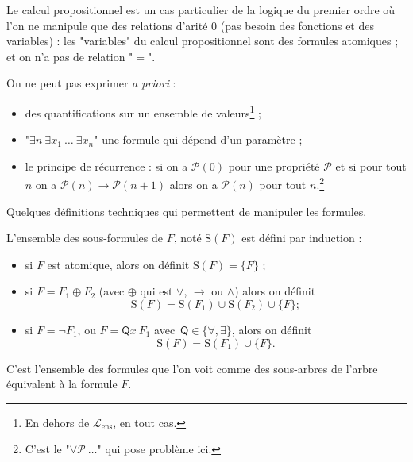 \documentclass[./main]{subfiles}
\begin{document}
  \begin{rmk}
    Le calcul propositionnel est un cas particulier de la logique du premier ordre
    où l'on ne manipule que des relations d'arité $0$ (pas besoin des fonctions et des variables) : les "variables" du calcul propositionnel sont des formules atomiques ; et on n'a pas de relation "$=$".
  \end{rmk}

  \begin{rmk}
    On ne peut pas exprimer \textit{a priori} :
    \begin{itemize}
      \item  des quantifications sur un ensemble de valeurs\footnote{En dehors de $\mathcal{L}_\mathrm{ens}$, en tout cas.} ;
      \item "$\exists n\ \exists x_1\: \ldots \: \exists x_n $" une formule qui dépend d'un paramètre ;
      \item le principe de récurrence : si on a $\mathcal{P}(0)$ pour une propriété $\mathcal{P}$ et si pour tout $n$ on a $\mathcal{P}(n) \to \mathcal{P}(n+1)$ alors on a $\mathcal{P}(n)$ pour tout $n$.\footnote{C'est le "$\forall \mathcal{P}\: \ldots$" qui pose problème ici.}
    \end{itemize}
  \end{rmk}

  Quelques définitions techniques qui permettent de manipuler les formules.

  \begin{defn}
    L'ensemble des sous-formules de $F$, noté $\mathrm{S}(F)$ est défini par induction :
    \begin{itemize}
      \item si $F$ est atomique, alors on définit $\mathrm{S}(F) = \{F\}$ ;
      \item si $F = F_1 \oplus F_2$ (avec $\oplus$ qui est $\lor$, $\to$ ou $\land$)
         alors on définit
         \[
         \mathrm{S}(F) = \mathrm{S}(F_1) \cup \mathrm{S}(F_2) \cup \{F\}
         ;\] 
      \item si $F = \lnot F_1$, ou $F = \mathsf{Q}x\: F_1$ avec~$\mathsf{Q} \in \{\forall, \exists\}$, alors on définit
        \[
        \mathrm{S}(F) = \mathrm{S}(F_1) \cup \{F\}
        .\] 
    \end{itemize}
    C'est l'ensemble des formules que l'on voit comme des sous-arbres de l'arbre équivalent à la formule $F$.
  \end{defn}
\end{document}
